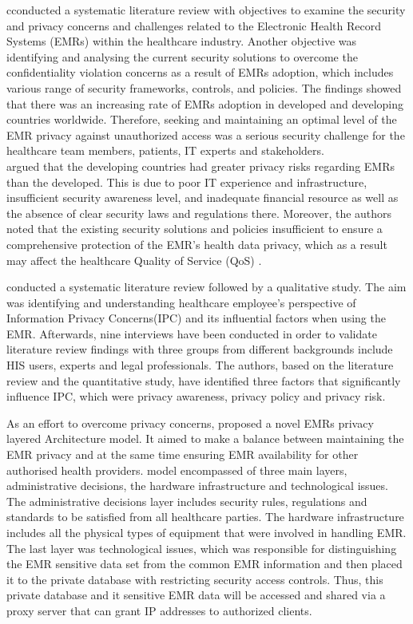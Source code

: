 \citet{Mahfuth2016} cconducted a systematic literature review with objectives to examine the security and privacy concerns and challenges related to the Electronic Health Record Systems (EMRs) within the healthcare industry. Another objective was identifying and analysing the current security solutions to overcome the confidentiality violation concerns as a result of EMRs adoption, which includes various range of security frameworks, controls, and policies. The findings showed that there was an increasing rate of EMRs adoption in developed and developing countries worldwide. Therefore, seeking and maintaining an optimal level of the EMR privacy against unauthorized access was a serious security challenge for the healthcare team members, patients, IT experts and stakeholders.\\
\citet{Mahfuth2016} argued that the developing countries had greater privacy risks regarding EMRs than the developed. This is due to poor IT experience and infrastructure, insufficient security awareness level, and inadequate financial resource as well as the absence of clear security laws and regulations there. Moreover, the authors noted that the existing security solutions and policies insufficient to ensure a comprehensive protection of the EMR’s health data privacy, which as a result may affect the healthcare Quality of Service (QoS) \cite{Mahfuth2016}.

\citet{Rahim2016} conducted a systematic literature review followed by a qualitative study. The aim was identifying and understanding healthcare employee’s perspective of Information Privacy Concerns(IPC) and its influential factors when using the EMR. Afterwards, nine interviews have been conducted in order to validate literature review findings with three groups from different backgrounds include HIS users, experts and legal professionals. The authors, based on the literature review and the quantitative study, have identified three factors that significantly influence IPC, which were privacy awareness, privacy policy and privacy risk. 

As an effort to overcome privacy concerns, \citet{Bensefia2014} proposed a novel EMRs privacy layered Architecture model. It aimed to make a balance between maintaining the EMR privacy and at the same time ensuring EMR availability for other authorised health providers.\citet{Bensefia2014} model encompassed of three main layers, administrative decisions, the hardware infrastructure and technological issues. The administrative decisions layer includes security rules, regulations and standards to be satisfied from all healthcare parties. The hardware infrastructure includes all the physical types of equipment that were involved in handling EMR. The last layer was technological issues, which was responsible for distinguishing the EMR sensitive data set from the common EMR information and then placed it to the private database with restricting security access controls. Thus, this private database and it sensitive EMR data will be accessed and shared via a proxy server that can grant IP addresses to authorized clients.


